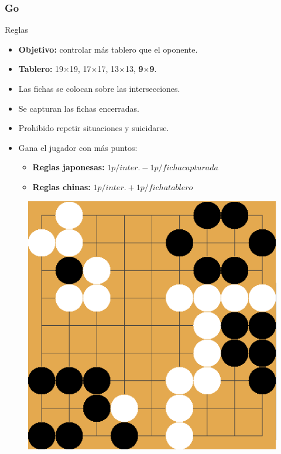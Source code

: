 \documentclass[10pt]{beamer}
\begin{document}
\begin{frame}[squeeze]
\frametitle{Go}
\begin{block}{Reglas}

\begin{itemize}
\item \textbf{Objetivo:}
controlar más tablero que el oponente.%
\item \textbf{Tablero:} 19$\times$19, 17$\times$17, 13$\times$13, \textbf{9$\times$9}.
\item Las fichas se colocan sobre las intersecciones.
\item Se capturan las fichas encerradas.
\item Prohibido repetir situaciones y suicidarse.
\item Gana el jugador con más puntos:
\begin{itemize}
	\item \textbf{Reglas japonesas:} $1p/inter. - 1p/fichacapturada$
	\item \textbf{Reglas chinas:} $1p/inter. + 1p/fichatablero$
\end{itemize}
\end{itemize}

\end{block}
\begin{figure}[t]
\centering
\includegraphics[scale=0.25]{imagenes/juego_go.png}
\label{fig:go_aplicacion}
\end{figure}

\end{frame}
\end{document}
